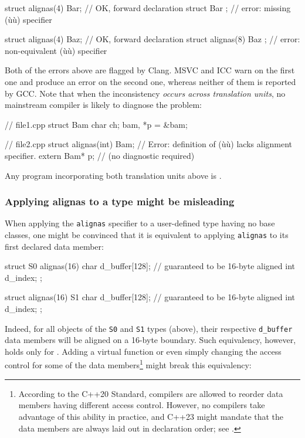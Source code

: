 \begin{emcppslisting}
struct alignas(4) Bar;      // OK, forward declaration
struct Bar { };             // error: missing (ù{}ù) specifier

struct alignas(4) Baz;      // OK, forward declaration
struct alignas(8) Baz { };  // error: non-equivalent (ù{}ù) specifier
\end{emcppslisting}
    
\noindent Both of the errors above are flagged by Clang. MSVC and ICC warn on the first one and produce an error on the second one, whereas neither of them is
reported by GCC. Note that when the inconsistency \emph{occurs across
translation units}, no mainstream compiler is likely to diagnose the
problem:

\begin{emcppslisting}
// file1.cpp
struct Bam { char ch; } bam, *p = &bam;

// file2.cpp
struct alignas(int) Bam;  // Error: definition of (ù{}ù) lacks alignment specifier.
extern Bam* p;            //        (no diagnostic required)
\end{emcppslisting}
    
\noindent Any program incorporating both translation units above is
.

\subsubsection[Applying \lstinline!alignas! to a \emph{type} might be misleading]{Applying {\SubsubsecCode alignas} to a {\sfbsubsubsecitalRomeo type} might be misleading}\label{applying-alignas-to-a-type-might-be-misleading}

When applying the \lstinline!alignas! specifier to a user-defined type having no base classes, one might be convinced that it is equivalent to applying \lstinline!alignas! to its first declared data member:

\begin{emcppslisting}
struct S0 {
    alignas(16) char d_buffer[128];  // guaranteed to be 16-byte aligned
                int  d_index;
};

struct alignas(16) S1 {
    char d_buffer[128];              // guaranteed to be 16-byte aligned
    int  d_index;
};
\end{emcppslisting}

Indeed, for all objects of the \lstinline!S0! and \lstinline!S1! types (above), their respective \lstinline!d_buffer! data members will be aligned on a 16-byte boundary. Such equivalency, however, holds only for .  Adding a virtual function or even simply changing the access control for some of the data members\footnote{According to the C++20 Standard, compilers are allowed to reorder data members having different access control.  However, no compilers take advantage of this ability in practice, and C++23 might mandate that the data members are always laid out in declaration order; see \cite{balog20}.} might break this equivalency:

